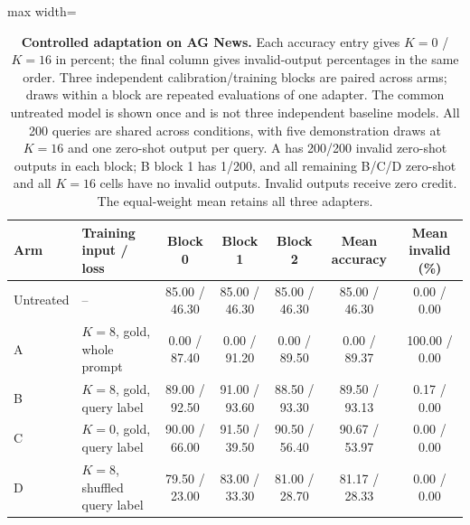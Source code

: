 \begin{table}[p]
\centering\color{blue}
\caption{\textbf{Controlled adaptation on AG News.} Each accuracy entry gives $K=0$ / $K=16$ in percent; the final column gives invalid-output percentages in the same order. Three independent calibration/training blocks are paired across arms; draws within a block are repeated evaluations of one adapter. The common untreated model is shown once and is not three independent baseline models. All 200 queries are shared across conditions, with five demonstration draws at $K=16$ and one zero-shot output per query. A has 200/200 invalid zero-shot outputs in each block; B block 1 has 1/200, and all remaining B/C/D zero-shot and all $K=16$ cells have no invalid outputs. Invalid outputs receive zero credit. The equal-weight mean retains all three adapters.}
\label{stab:final_training}
\footnotesize
\begin{adjustbox}{max width=\textwidth}
\begin{tabular}{llccccc}
\toprule
Arm & Training input / loss & Block 0 & Block 1 & Block 2 & Mean accuracy & Mean invalid (\%) \\
\midrule
Untreated & -- & 85.00 / 46.30 & 85.00 / 46.30 & 85.00 / 46.30 & 85.00 / 46.30 & 0.00 / 0.00 \\
A & $K=8$, gold, whole prompt & 0.00 / 87.40 & 0.00 / 91.20 & 0.00 / 89.50 & 0.00 / 89.37 & 100.00 / 0.00 \\
B & $K=8$, gold, query label & 89.00 / 92.50 & 91.00 / 93.60 & 88.50 / 93.30 & 89.50 / 93.13 & 0.17 / 0.00 \\
C & $K=0$, gold, query label & 90.00 / 66.00 & 91.50 / 39.50 & 90.50 / 56.40 & 90.67 / 53.97 & 0.00 / 0.00 \\
D & $K=8$, shuffled query label & 79.50 / 23.00 & 83.00 / 33.30 & 81.00 / 28.70 & 81.17 / 28.33 & 0.00 / 0.00 \\
\bottomrule
\end{tabular}
\end{adjustbox}
\end{table}

